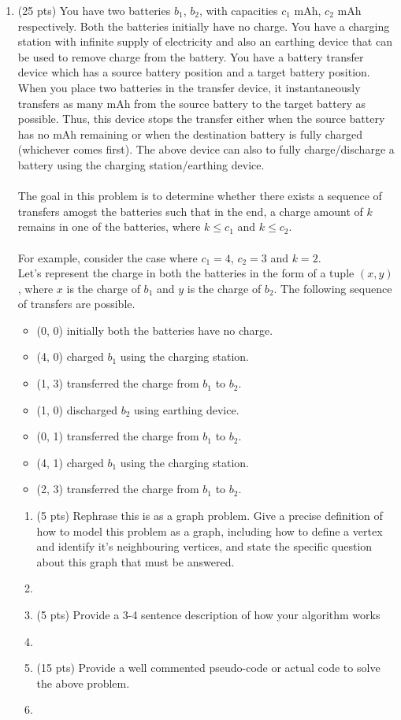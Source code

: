 \documentclass[12pt]{article}
\newcommand{\makenonemptybox}[2]{%
\item[]
\fbox{%
\parbox[c][#1][t]{\dimexpr\linewidth-2\fboxsep-2\fboxrule}{
  \hrule width \hsize height 0pt
  #2
 }%
}%
\par\vspace{\ht\strutbox}
}
\begin{document}
\begin{enumerate}
	\item{(25 pts) You have two batteries $b_1$, $b_2$, with capacities $c_1$ mAh, $c_2$ mAh  respectively. Both the batteries initially have no charge. You have a charging station  with infinite supply of electricity and also an earthing device that can be used to remove charge from the battery. You have a battery transfer device which has a source battery position and a target battery position. When you place two batteries in the transfer device, it instantaneously transfers as many mAh from the source battery to the target battery as possible. Thus, this device stops the transfer either when the source battery has no mAh remaining or when the destination battery is fully charged (whichever comes first). The above device can also to fully charge/discharge a battery using the charging station/earthing device.\\ \\
	The goal in this problem is to determine whether there exists a sequence of transfers amogst the batteries such that in the end, a charge amount of $k$ remains in one of the batteries, where $k \le c_1$ and $k \le c_2$.\\ \\
	For example, consider the case where $c_1 = 4$, $c_2 = 3$ and $k=2$. \\ 
	Let's represent the charge in both the batteries in the form of a tuple $(x, y)$, where $x$ is the charge of $b_1$ and $y$ is the charge of $b_2$. The following sequence of transfers are possible.
	\begin{itemize}
	    \item (0, 0) initially both the batteries have no charge. 
	    \item (4, 0) charged $b_1$ using the charging station.
	    \item (1, 3) transferred the charge from $b_1$ to $b_2$.
	    \item (1, 0) discharged $b_2$ using earthing device.
	    \item (0, 1) transferred the charge from $b_1$ to $b_2$.
	    \item (4, 1) charged $b_1$ using the charging station.
	    \item (2, 3) transferred the charge from $b_1$ to $b_2$.
	    
	\end{itemize}
	}
	\clearpage
	\begin{enumerate}[label=(\alph*)]
	    \item(5 pts)  Rephrase this is as a graph problem. Give a precise definition of how to model this problem as a graph, including how to define a vertex and identify it's neighbouring vertices, and state the specific question about this graph that must be answered.
        \makenonemptybox{3in}{}
        \item(5 pts) Provide a 3-4 sentence description of how your algorithm works
        \makenonemptybox{3in}{}
        \clearpage
        \item(15 pts) Provide a well commented pseudo-code or actual code to solve the above problem.
        \makenonemptybox{6.5in}{}
	\end{enumerate}
	

\end{enumerate}
\end{document}
